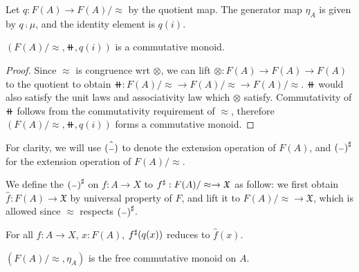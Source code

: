 Let $q : F(A) \to F(A) / \approx$ by the quotient map.
The generator map $\eta_A$ is given by $q \comp \mu$, and the identity element is $q(i)$.

\begin{proposition}
$(F(A) / \approx, \doubleplus, q(i))$ is a commutative monoid.
\end{proposition}

\begin{proof}
Since $\approx$ is congruence wrt $\otimes$,
we can lift $\otimes : F(A) \to F(A) \to F(A)$ to the quotient to obtain
$\doubleplus : F(A) / \approx \to F(A) / \approx \to F(A) / \approx$.
$\doubleplus$ would also satisfy the unit laws and associativity law which $\otimes$ satisfy.
Commutativity of $\doubleplus$ follows from the commutativity requirement of $\approx$,
therefore $(F(A) / \approx, \doubleplus, q(i))$ forms a commutative monoid.
\end{proof}

For clarity, we will use $\hat{({\scriptstyle{-}})}$ to denote the extension operation of $F(A)$, 
and ${({\scriptstyle{-}})}^{\sharp}$ for the extension operation of $F(A) / \approx$.

\begin{definition}
We define the ${({\scriptstyle{-}})}^{\sharp}$ on $f : A \to X$ to ${f}^{\sharp} : F(A) / \approx \to \mathfrak{X}$ as follow:
we first obtain $\hat{f} : F(A) \to \mathfrak{X}$ by universal property of $F$, and lift it
to $F(A) / \approx \to \mathfrak{X}$, which is allowed since $\approx$ respects ${({\scriptstyle{-}})}^{\sharp}$.
\end{definition}

\begin{proposition}
    For all $f : A \to X$, $x : F(A)$, ${f}^{\sharp}(q(x))$ reduces to $\hat{f}(x)$.
\end{proposition}

\begin{proposition}
    $(F(A) / \approx,\eta_A)$ is the free commutative monoid on $A$.
\end{proposition}

